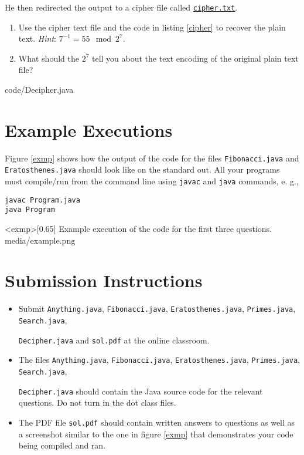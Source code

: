 \documentclass{article}
\begin{document}
He then redirected the output to a cipher file called
\href{https://tinyurl.com/24pjud2t}{\texttt{cipher.txt}}.

\begin{enumerate}
  \item Use the cipher text file and the code in listing \ref{cipher} to
        recover the plain text. \textit{Hint}: $7^{-1} = 55 \mod 2^7$.
  \item What should the $2^7$ tell you about the text encoding of the
        original plain text file?
\end{enumerate}


{code/Decipher.java}

\section{Example Executions}

Figure \ref{exmp} shows how the output of the code for the files
\texttt{Fibonacci.java} and \texttt{Eratosthenes.java} should look
like on the standard out. All your programs must compile/run from
the command line using \texttt{javac} and \texttt{java} commands,
e. g.,

\begin{verbatim}
javac Program.java
java Program
\end{verbatim}

\img<exmp>[0.65]
{Example execution of the code for the first three questions.} {media/example.png}

\section{Submission Instructions}

\begin{itemize}
  \item Submit \texttt{Anything.java}, \texttt{Fibonacci.java},
        \texttt{Eratosthenes.java}, \texttt{Primes.java},
        \texttt{Search.java},

        \noindent\texttt{Decipher.java} and
        \texttt{sol.pdf} at the online classroom.

  \item The files \texttt{Anything.java}, \texttt{Fibonacci.java},
        \texttt{Eratosthenes.java}, \texttt{Primes.java},
        \texttt{Search.java},

        \noindent\texttt{Decipher.java} should contain the
        Java source code for the relevant questions. Do not turn in the dot class files.

  \item The PDF file \texttt{sol.pdf} should contain written answers to
        questions as well as a screenshot similar to the one in figure \ref{exmp}
        that demonstrates your code being compiled and ran.
\end{itemize}
\end{document}

